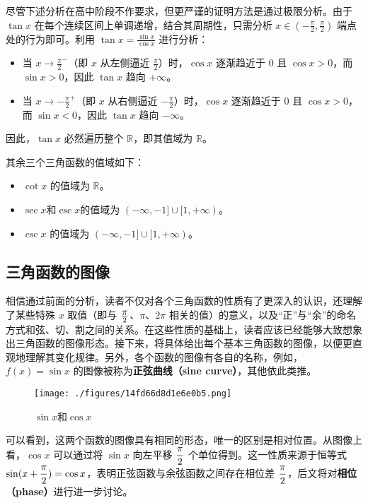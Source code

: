 尽管下述分析在高中阶段不作要求，但更严谨的证明方法是通过极限分析。由于 $\tan x$ 在每个连续区间上单调递增，结合其周期性，只需分析 $\displaystyle x\in\left(-\frac{\pi}{2},\frac{\pi}{2}\right)$ 端点处的行为即可。利用 $\displaystyle \tan x = \frac{\sin x}{\cos x}$ 进行分析：

\begin{itemize}
\item 当 $\displaystyle x \to \frac{\pi}{2}^-$（即 $x$ 从左侧逼近 $\displaystyle \frac{\pi}{2}$）时，$\cos x$ 逐渐趋近于 $0$ 且 $\cos x > 0$，而 $\sin x > 0$，因此 $\tan x$ 趋向 $+\infty$。
\item 当 $\displaystyle x \to -\frac{\pi}{2}^+$（即 $x$ 从右侧逼近 $\displaystyle -\frac{\pi}{2}$）时，$\cos x$ 逐渐趋近于 $0$ 且 $\cos x > 0$，而 $\sin x < 0$，因此 $\tan x$ 趋向 $-\infty$。
\end{itemize}

因此，$\tan x$ 必然遍历整个 $\mathbb{R}$，即其值域为 $\mathbb{R}$。

其余三个三角函数的值域如下：
\begin{itemize}
\item $\cot x$ 的值域为 $\mathbb{R}$。
\item $\sec x$和$\csc x$的值域为 $(-\infty, -1] \cup [1, +\infty)$。
\item $\csc x$ 的值域为 $(-\infty, -1] \cup [1, +\infty)$。
\end{itemize}

\subsection{三角函数的图像}

相信通过前面的分析，读者不仅对各个三角函数的性质有了更深入的认识，还理解了某些特殊 $x$ 取值（即与 $\displaystyle\pi\over2$、$\pi$、$2\pi$ 相关的值）的意义，以及“正”与“余”的命名方式和弦、切、割之间的关系。在这些性质的基础上，读者应该已经能够大致想象出三角函数的图像形态。接下来，将具体给出每个基本三角函数的图像，以便更直观地理解其变化规律。另外，各个函数的图像有各自的名称，例如，$f(x) = \sin x$ 的图像被称为\textbf{正弦曲线（sine curve）}，其他依此类推。

\begin{figure}[ht]
\centering
\texttt{[image: ./figures/14fd66d8d1e6e0b5.png]}
\caption{$\sin x$和$\cos x$} \label{fig_HsTFFv_1}
\end{figure}

可以看到，这两个函数的图像具有相同的形态，唯一的区别是相对位置。从图像上看，$\cos x$ 可以通过将 $\sin x$ 向左平移 $\displaystyle{\pi\over2}$ 个单位得到。这一性质来源于恒等式 $\displaystyle\sin(x + {\pi\over2}) = \cos x$，表明正弦函数与余弦函数之间存在相位差 $\displaystyle{\pi\over2}$，后文将对\textbf{相位（phase）}进行进一步讨论。

